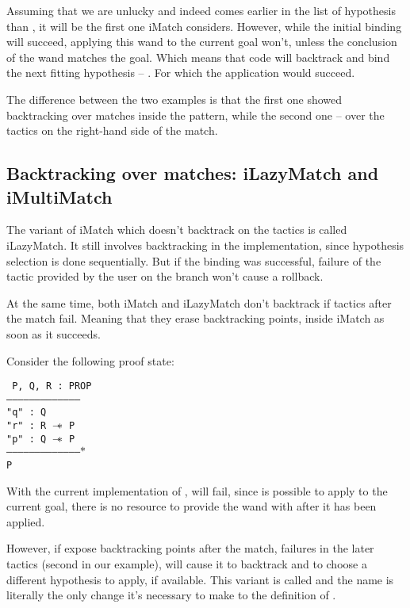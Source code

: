Assuming that we are unlucky and  indeed comes earlier in the list of hypothesis than , it will be the first one iMatch considers.
However, while the initial binding will succeed, applying this wand to the current goal won't, unless the conclusion of the wand matches the goal.
Which means that code will backtrack and bind the next fitting hypothesis -- .
For which the application would succeed.

The difference between the two examples is that the first one showed backtracking over matches inside the pattern, while the second one -- over the tactics on the right-hand side of the match.

\subsection{Backtracking over matches: iLazyMatch and iMultiMatch}

The variant of iMatch which doesn't backtrack on the tactics is called iLazyMatch.
It still involves backtracking in the implementation, since hypothesis selection is done sequentially.
But if the binding was successful, failure of the tactic provided by the user on the branch won't cause a rollback.

At the same time, both iMatch and iLazyMatch don't backtrack if tactics after the match fail.
Meaning that they erase backtracking points, inside iMatch as soon as it succeeds.

Consider the following proof state:

\texttt{
P, Q, R : PROP\\
---------------------------------------\\
"q" : Q\\
"r" : R $\mathrel{-\mkern-6mu*}$ P\\
"p" : Q $\mathrel{-\mkern-6mu*}$ P\\
--------------------------------------$\ast$\\
P
}

With the current implementation of ,  will fail, since  is possible to apply to the current goal, there is no resource to provide the wand with after it has been applied.

However, if expose backtracking points after the match, failures in the later tactics (second  in our example), will cause it to backtrack and
to choose a different hypothesis to apply, if available.
This variant is called  and the name is literally the only change it's necessary to make to the definition of .

